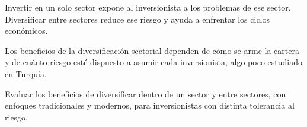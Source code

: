 \documentclass{article}
\newcommand{\bodysize}{\fontsize{27}{35.6}\selectfont}
\newcommand{\cardtitlesize}{\fontsize{31.9}{38.3}\selectfont}
\newcommand{\smallsize}{\fontsize{22.1}{28.7}\selectfont}
\newcommand{\cardtitle}[2][navy]{{\color{#1}\cardtitlesize\bfseries\textls[110]{\MakeUppercase{#2}}}\par\vspace{7mm}}
\begin{document}
\vfill
\hspace*{34mm}\begin{minipage}{773mm}
\begin{tcolorbox}[enhanced, sharp corners, colback=navy, boxrule=0pt, left=16mm, right=16mm, top=12mm, bottom=11mm,
  fontupper=\bodysize\raggedright, overlay={\fill[gold] (frame.north west) rectangle ([yshift=-5mm]frame.north east);}]
\begin{minipage}[t]{174.8mm}\raggedright{\color{acento}\smallsize\bfseries{}}\par{}\end{minipage}\hfill\begin{minipage}[t]{174.8mm}\raggedright{\color{acento}\smallsize\bfseries{}}\par{}\end{minipage}\hfill\begin{minipage}[t]{174.8mm}\raggedright{\color{acento}\smallsize\bfseries{}}\par{}\end{minipage}\hfill\begin{minipage}[t]{174.8mm}\raggedright{\color{acento}\smallsize\bfseries{}}\par{}\end{minipage}
\end{tcolorbox}
\end{minipage}

\vfill
\hspace*{34mm}\begin{minipage}{773mm}
\begin{tcbraster}[raster columns=3, raster equal height, raster column skip=16mm]
\begin{tcolorbox}[card]\cardtitle{Contexto}Invertir en un solo sector expone al inversionista a los problemas de ese sector. Diversificar entre sectores reduce ese riesgo y ayuda a enfrentar los ciclos económicos.\end{tcolorbox}
\begin{tcolorbox}[card]\cardtitle{Problema}Los beneficios de la diversificación sectorial dependen de cómo se arme la cartera y de cuánto riesgo esté dispuesto a asumir cada inversionista, algo poco estudiado en Turquía.\end{tcolorbox}
\begin{tcolorbox}[card]\cardtitle{Objetivo}Evaluar los beneficios de diversificar dentro de un sector y entre sectores, con enfoques tradicionales y modernos, para inversionistas con distinta tolerancia al riesgo.\end{tcolorbox}
\end{tcbraster}
\end{minipage}
\end{document}
